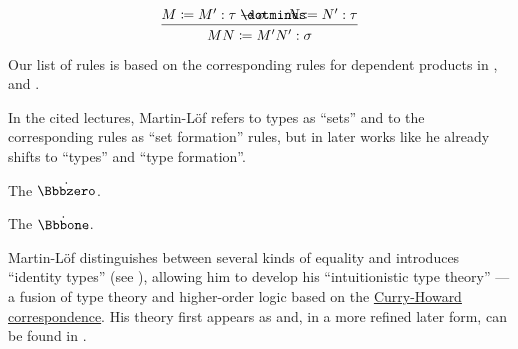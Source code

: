 \begin{remark}
\begin{thmenum}
\begin{thmenum}
\begin{paracol}{2}
        \begin{rightcolumn}
          \ParacolAlignmentHack
          \begin{equation*}
            \begin{prooftree}
              \hypo{ M \coloneqq M': \tau \synimplies \sigma }
              \hypo{ N \coloneqq N': \tau }
              \infer2{ M N \coloneqq M' N': \sigma }
            \end{prooftree}
          \end{equation*}
        \end{rightcolumn}
      \end{paracol}
    \end{thmenum}
  \end{thmenum}
\end{remark}
\begin{comments}
  \item Our list of rules is based on the corresponding rules for dependent products in , \cite[\S A.2]{UnivalentProject2024OctoberHoTT} and \cite[\S 8.1.10]{Mimram2020ProgramEqualsProof}.

  \item In the cited lectures, Martin-L\"of refers to types as \enquote{sets} and to the corresponding rules as \enquote{set formation} rules, but in later works like \cite{MartinLöf1994TypeJudgments} he already shifts to \enquote{types} and \enquote{type formation}.
\end{comments}

\begin{definition}\label{def:empty_type}
  The  \( \syn\Bbbzero \).
\end{definition}

\begin{definition}\label{def:unit_type}
  The  \( \syn\Bbbone \).
\end{definition}

\begin{definition}\label{def:product_type}
\end{definition}

\begin{definition}\label{def:sum_type}
\end{definition}

\begin{concept}\label{con:identity_types}

  Martin-L\"of distinguishes between several kinds of equality and introduces \enquote{identity types} (see ), allowing him to develop his \enquote{intuitionistic type theory} --- a fusion of type theory and higher-order logic based on the \hyperref[con:curry_howard_correspondence]{Curry-Howard correspondence}. His theory first appears as \cite{MartinLöf1975IntuitionisticTypeTheory} and, in a more refined later form, can be found in \cite{MartinLöf1984IntuitionisticTypeTheory}.
\end{concept}

